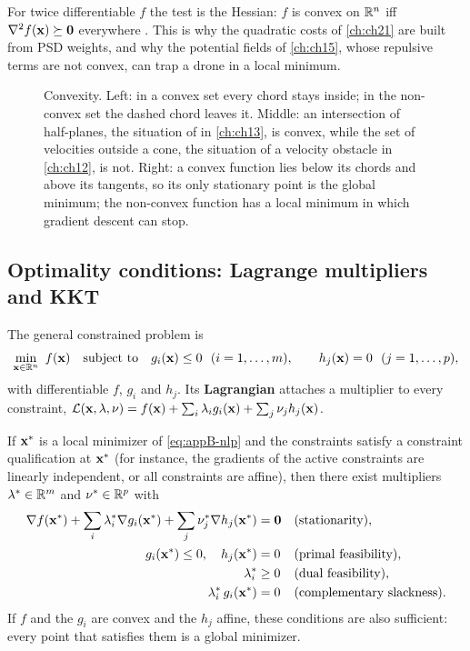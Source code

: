 For twice differentiable $f$ the test is the Hessian: $f$ is convex on $\mathbb{R}^n$
iff $\nabla^2 f(\mathbf{x}) \succeq \mathbf{0}$ everywhere
\cite[Section~3.1]{boyd2004convex}. This is why the quadratic costs of
\cref{ch:ch21} are built from PSD weights, and why the potential fields of
\cref{ch:ch15}, whose repulsive terms are not convex, can trap a drone in a
local minimum.

\begin{figure}[tb]
  \centering
  \caption{Convexity. Left: in a convex set every chord stays inside; in the non-convex set the dashed chord leaves it. Middle: an intersection of half-planes, the situation of \orca in \cref{ch:ch13}, is convex, while the set of velocities outside a cone, the situation of a velocity obstacle in \cref{ch:ch12}, is not. Right: a convex function lies below its chords and above its tangents, so its only stationary point is the global minimum; the non-convex function has a local minimum in which gradient descent can stop.}
  \label{fig:appB-convex}
\end{figure}

\subsection{Optimality conditions: Lagrange multipliers and KKT}
\label{sec:appB-kkt}

The general constrained problem is
\begin{equation}
  \min_{\mathbf{x} \in \mathbb{R}^n}\ f(\mathbf{x})\quad \text{subject to}\quad g_i(\mathbf{x}) \le 0\ \ (i = 1, \dots, m),\qquad h_j(\mathbf{x}) = 0\ \ (j = 1, \dots, p),
  \label{eq:appB-nlp}
\end{equation}
with differentiable $f$, $g_i$ and $h_j$. Its
\textbf{Lagrangian} attaches a multiplier to every
constraint, $\mathcal{L}(\mathbf{x}, \mathbf{\lambda}, \mathbf{\nu}) = f(\mathbf{x}) +
\sum_i \lambda_i g_i(\mathbf{x}) + \sum_j \nu_j h_j(\mathbf{x})$.

\begin{theorem}
\label{thm:appB-kkt}
If $\mathbf{x}^*$ is a local minimizer of \cref{eq:appB-nlp} and the constraints satisfy a constraint qualification at $\mathbf{x}^*$ (for instance, the gradients of the active constraints are linearly independent, or all constraints are affine), then there exist multipliers $\mathbf{\lambda}^* \in \mathbb{R}^m$ and $\mathbf{\nu}^* \in \mathbb{R}^p$ with
\begin{align}
  \nabla f(\mathbf{x}^*) + \sum_i \lambda_i^*\nabla g_i(\mathbf{x}^*) + \sum_j \nu_j^*\nabla h_j(\mathbf{x}^*) &= \mathbf{0} && \text{(stationarity)},\label{eq:appB-kkt-stat}\\
  g_i(\mathbf{x}^*) \le 0,\quad h_j(\mathbf{x}^*) &= 0 && \text{(primal feasibility)},\\
  \lambda_i^* &\ge 0 && \text{(dual feasibility)},\\
  \lambda_i^*\,g_i(\mathbf{x}^*) &= 0 && \text{(complementary slackness)}.\label{eq:appB-kkt-cs}
\end{align}
If $f$ and the $g_i$ are convex and the $h_j$ affine, these conditions are also sufficient: every point that satisfies them is a global minimizer.
\end{theorem}

